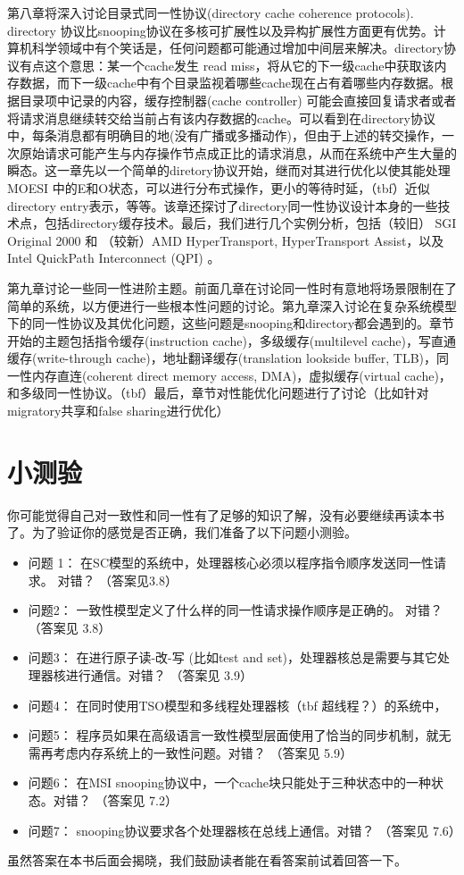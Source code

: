 \documentclass[UTF-8]{ctexrep}
\begin{document}
\par 第八章将深入讨论目录式同一性协议(directory cache coherence protocols). directory 协议比snooping协议在多核可扩展性以及异构扩展性方面更有优势。计算机科学领域中有个笑话是，任何问题都可能通过增加中间层来解决。directory协议有点这个意思：某一个cache发生 read miss，将从它的下一级cache中获取该内存数据，而下一级cache中有个目录监视着哪些cache现在占有着哪些内存数据。根据目录项中记录的内容，缓存控制器(cache controller) 可能会直接回复请求者或者将请求消息继续转交给当前占有该内存数据的cache。可以看到在directory协议中，每条消息都有明确目的地(没有广播或多播动作)，但由于上述的转交操作，一次原始请求可能产生与内存操作节点成正比的请求消息，从而在系统中产生大量的瞬态。这一章先以一个简单的diretory协议开始，继而对其进行优化以使其能处理MOESI 中的E和O状态，可以进行分布式操作，更小的等待时延，（tbf）近似directory entry表示，等等。该章还探讨了directory同一性协议设计本身的一些技术点，包括directory缓存技术。最后，我们进行几个实例分析，包括（较旧） SGI Original 2000 和 （较新）AMD HyperTransport, HyperTransport Assist，以及 Intel QuickPath Interconnect (QPI) 。
\par 第九章讨论一些同一性进阶主题。前面几章在讨论同一性时有意地将场景限制在了简单的系统，以方便进行一些根本性问题的讨论。第九章深入讨论在复杂系统模型下的同一性协议及其优化问题，这些问题是snooping和directory都会遇到的。章节开始的主题包括指令缓存(instruction cache)，多级缓存(multilevel cache)，写直通缓存(write-through cache)，地址翻译缓存(translation lookside buffer, TLB)，同一性内存直连(coherent direct memory access, DMA)，虚拟缓存(virtual cache)，和多级同一性协议。（tbf）最后，章节对性能优化问题进行了讨论（比如针对migratory共享和false sharing进行优化）
\section {小测验}
你可能觉得自己对一致性和同一性有了足够的知识了解，没有必要继续再读本书了。为了验证你的感觉是否正确，我们准备了以下问题小测验。
\begin{itemize}
\item 问题 1： 在SC模型的系统中，处理器核心必须以程序指令顺序发送同一性请求。 对错？ （答案见3.8）
\item 问题2： 一致性模型定义了什么样的同一性请求操作顺序是正确的。 对错？ （答案见 3.8）
\item 问题3： 在进行原子读-改-写 (比如test and set)，处理器核总是需要与其它处理器核进行通信。对错？ （答案见 3.9）
\item 问题4： 在同时使用TSO模型和多线程处理器核（tbf  超线程？）的系统中，
\item 问题5： 程序员如果在高级语言一致性模型层面使用了恰当的同步机制，就无需再考虑内存系统上的一致性问题。对错？ （答案见 5.9）
\item 问题6： 在MSI snooping协议中，一个cache块只能处于三种状态中的一种状态。对错？ （答案见 7.2）
\item 问题7： snooping协议要求各个处理器核在总线上通信。对错？ （答案见 7.6）
\end{itemize}
\par 虽然答案在本书后面会揭晓，我们鼓励读者能在看答案前试着回答一下。
\end{document}
